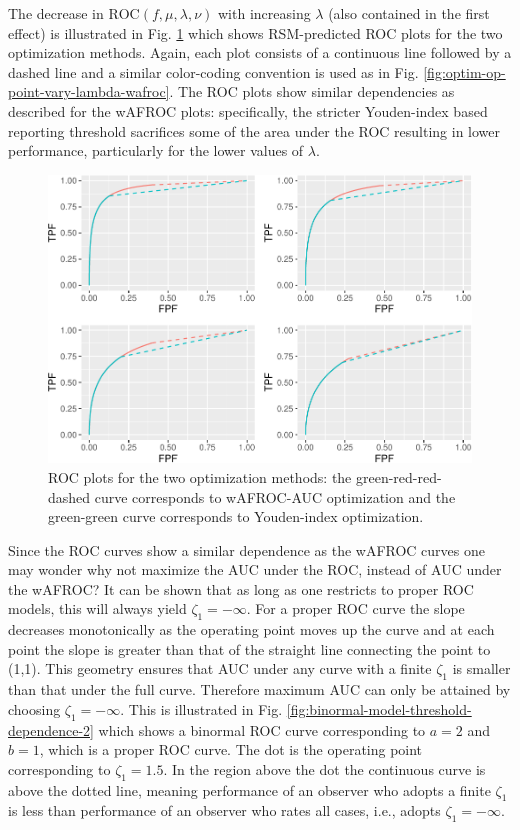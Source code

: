 \documentclass[
]{book}
\begin{document}
The decrease in \(\text{ROC} \left ( f, \mu, \lambda, \nu \right )\) with increasing \(\lambda\) (also contained in the first effect) is illustrated in Fig. \ref{fig:optim-op-point-vary-lambda-roc} which shows RSM-predicted ROC plots for the two optimization methods. Again, each plot consists of a continuous line followed by a dashed line and a similar color-coding convention is used as in Fig. \ref{fig:optim-op-point-vary-lambda-wafroc}. The ROC plots show similar dependencies as described for the wAFROC plots: specifically, the stricter Youden-index based reporting threshold sacrifices some of the area under the ROC resulting in lower performance, particularly for the lower values of \(\lambda\).

\begin{figure}
\centering
\includegraphics{21-optim-op-point_files/figure-latex/optim-op-point-vary-lambda-roc-1.pdf}
\caption{\label{fig:optim-op-point-vary-lambda-roc}ROC plots for the two optimization methods: the green-red-red-dashed curve corresponds to wAFROC-AUC optimization and the green-green curve corresponds to Youden-index optimization.}
\end{figure}

Since the ROC curves show a similar dependence as the wAFROC curves one may wonder why not maximize the AUC under the ROC, instead of AUC under the wAFROC? It can be shown that as long as one restricts to proper ROC models, this will always yield \(\zeta_1 = -\infty\). For a proper ROC curve the slope decreases monotonically as the operating point moves up the curve and at each point the slope is greater than that of the straight line connecting the point to (1,1). This geometry ensures that AUC under any curve with a finite \(\zeta_1\) is smaller than that under the full curve. Therefore maximum AUC can only be attained by choosing \(\zeta_1 = -\infty\). This is illustrated in Fig. \ref{fig:binormal-model-threshold-dependence-2} which shows a binormal ROC curve corresponding to \(a = 2\) and \(b = 1\), which is a proper ROC curve. The dot is the operating point corresponding to \(\zeta_1 = 1.5\). In the region above the dot the continuous curve is above the dotted line, meaning performance of an observer who adopts a finite \(\zeta_1\) is less than performance of an observer who rates all cases, i.e., adopts \(\zeta_1 = -\infty\).
\end{document}
